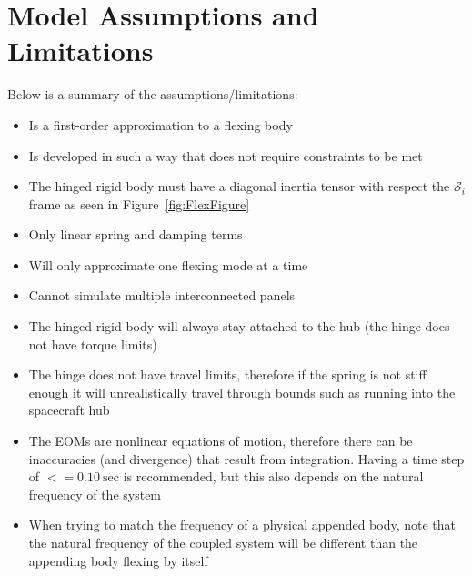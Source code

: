 \section{Model Assumptions and Limitations}
Below is a summary of the assumptions/limitations:

\begin{itemize}
	\item Is a first-order approximation to a flexing body
\item Is developed in such a way that does not require constraints to be met
	\item The hinged rigid body must have a diagonal inertia tensor with respect the $\mathcal{S}_i$ frame as seen in Figure~\ref{fig:FlexFigure}
	\item Only linear spring and damping terms
	\item Will only approximate one flexing mode at a time
	\item Cannot simulate multiple interconnected panels
	\item The hinged rigid body will always stay attached to the hub (the hinge does not have torque limits)
	\item The hinge does not have travel limits, therefore if the spring is not stiff enough it will unrealistically travel through bounds such as running into the spacecraft hub
	\item The EOMs are nonlinear equations of motion, therefore there can be inaccuracies (and divergence) that result from integration. Having a time step of $<= 0.10\ \text{sec}$ is recommended, but this also depends on the natural frequency of the system
	\item When trying to match the frequency of a physical appended body, note that the natural frequency of the coupled system will be different than the appending body flexing by itself
\end{itemize}